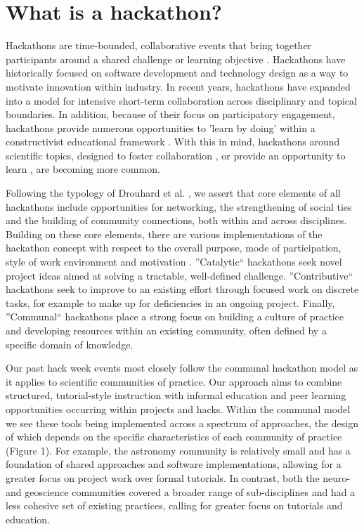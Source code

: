 \section*{What is a hackathon?}

Hackathons are time-bounded, collaborative events that bring together participants around a shared challenge or learning objective \cite{Decker2015}.
Hackathons have historically focused on software development and technology design as a way to motivate innovation within industry.
In recent years, hackathons have expanded into a model for intensive short-term collaboration across disciplinary and topical boundaries.
In addition, because of their focus on participatory engagement, hackathons provide numerous opportunities to 'learn by doing' within a constructivist educational framework \cite{Bransford2000-lu,Papert1980-fh}.
With this in mind, hackathons around scientific topics, designed to foster collaboration \cite{Groen2015-cj,Moller2013-ah}, or provide an opportunity to learn \cite{Kienzler2015-zu,Lamers2014-xf}, are becoming more common.

Following the typology of Drouhard et al. \cite{Drouhard2017}, we assert that core elements of all hackathons include opportunities for networking, the strengthening of social ties and the building of community connections, both within and across disciplines.
Building on these core elements, there are various implementations of the hackathon concept with respect to the overall purpose, mode of participation, style of work environment and motivation \cite{Drouhard2017}.
''Catalytic`` hackathons seek novel project ideas aimed at solving a tractable, well-defined challenge.
''Contributive`` hackathons seek to improve to an existing effort through focused work on discrete tasks, for example to make up for deficiencies in an ongoing project.
Finally, ''Communal`` hackathons place a strong focus on building a culture of practice and developing resources within an existing community, often defined by a specific domain of knowledge.

Our past hack week events most closely follow the communal hackathon model as it applies to scientific communities of practice.
Our approach aims to combine structured, tutorial-style instruction with informal education and peer learning opportunities occurring within projects and hacks.
Within the communal model we see these tools being implemented across a spectrum of approaches, the design of which depends on the specific characteristics of each community of practice (Figure 1).
For example, the astronomy community is relatively small and has a foundation of shared approaches and software implementations, allowing for a greater focus on project work over formal tutorials.
In contrast, both the neuro- and geoscience communities covered a broader range of sub-disciplines and had a less cohesive set of existing practices, calling for greater focus on tutorials and education.

